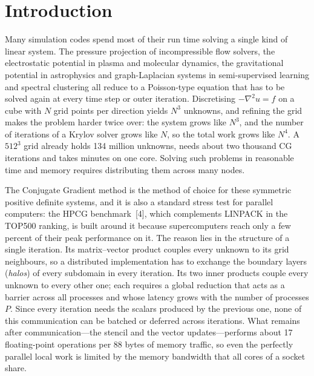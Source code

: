 \documentclass[10pt,a4paper]{article}
\begin{document}
\section{Introduction}\label{sec:intro}

Many simulation codes spend most of their run time solving a single kind of linear system. The pressure
projection of incompressible flow solvers, the electrostatic potential in plasma and molecular dynamics,
the gravitational potential in astrophysics and graph-Laplacian systems in semi-supervised learning and
spectral clustering all reduce to a Poisson-type equation that has to be solved again at every time step
or outer iteration. Discretising $-\nabla^2u=f$ on a cube with $N$ grid points per direction yields
$N^3$ unknowns, and refining the grid makes the problem harder twice over: the system grows like $N^3$,
and the number of iterations of a Krylov solver grows like $N$, so the total work grows like $N^4$. A
$512^3$ grid already holds 134 million unknowns, needs about two thousand CG iterations and takes
\SzSolveMaxMin{} minutes on one core. Solving such problems in reasonable time and memory requires
distributing them across many nodes.

The Conjugate Gradient method is the method of choice for these symmetric positive definite systems, and
it is also a standard stress test for parallel computers: the HPCG benchmark~[4], which complements LINPACK
in the TOP500 ranking, is built around it because supercomputers reach only a few percent of their peak
performance on it. The reason lies in the structure of a single iteration. Its matrix--vector product
couples every unknown to its grid neighbours, so a distributed implementation has to exchange the
boundary layers (\emph{halos}) of every subdomain in every iteration. Its two inner products couple every
unknown to every other one; each requires a global reduction that acts as a barrier across all
processes and whose latency grows with the number of processes $P$. Since every iteration needs the
scalars produced by the previous one, none of this communication can be batched or deferred across
iterations. What remains after communication---the stencil and the vector updates---performs about
17 floating-point operations per 88 bytes of memory traffic, so even the perfectly parallel local work is
limited by the memory bandwidth that all cores of a socket share.
\end{document}
